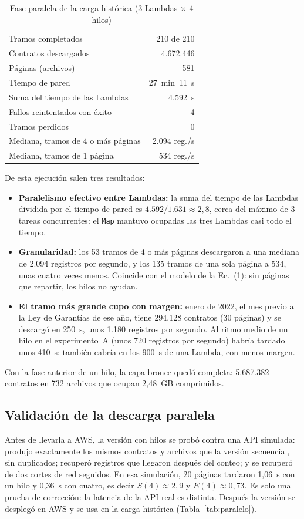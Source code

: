 \documentclass[conference]{IEEEtran}
\begin{document}
\begin{table}[htbp]
\caption{Fase paralela de la carga histórica (3 Lambdas $\times$ 4 hilos)}
\label{tab:fase}
\centering
\begin{tabular}{@{}lr@{}}
\toprule
Tramos completados & 210 de 210 \\
Contratos descargados & 4.672.446 \\
Páginas (archivos) & 581 \\
Tiempo de pared & 27~min~11~s \\
Suma del tiempo de las Lambdas & 4.592~s \\
Fallos reintentados con éxito & 4 \\
Tramos perdidos & 0 \\
\midrule
Mediana, tramos de 4 o más páginas & 2.094 reg./s \\
Mediana, tramos de 1 página & 534 reg./s \\
\bottomrule
\end{tabular}
\end{table}

De esta ejecución salen tres resultados:
\begin{itemize}
  \item \textbf{Paralelismo efectivo entre Lambdas:} la suma del tiempo de las Lambdas dividida por el tiempo de pared es $4.592 / 1.631 \approx 2{,}8$, cerca del máximo de 3 tareas concurrentes: el \texttt{Map} mantuvo ocupadas las tres Lambdas casi todo el tiempo.
  \item \textbf{Granularidad:} los 53 tramos de 4 o más páginas descargaron a una mediana de 2.094 registros por segundo, y los 135 tramos de una sola página a 534, unas cuatro veces menos. Coincide con el modelo de la Ec.~(1): sin páginas que repartir, los hilos no ayudan.
  \item \textbf{El tramo más grande cupo con margen:} enero de 2022, el mes previo a la Ley de Garantías de ese año, tiene 294.128 contratos (30 páginas) y se descargó en 250~s, unos 1.180 registros por segundo. Al ritmo medio de un hilo en el experimento~A (unos 720 registros por segundo) habría tardado unos 410~s: también cabría en los 900~s de una Lambda, con menos margen.
\end{itemize}

Con la fase anterior de un hilo, la capa bronce quedó completa: 5.687.382 contratos en 732 archivos que ocupan 2,48~GB comprimidos.

\subsection{Validación de la descarga paralela}
Antes de llevarla a AWS, la versión con hilos se probó contra una API simulada: produjo exactamente los mismos contratos y archivos que la versión secuencial, sin duplicados; recuperó registros que llegaron después del conteo; y se recuperó de dos cortes de red seguidos. En esa simulación, 20 páginas tardaron 1,06~s con un hilo y 0,36~s con cuatro, es decir $S(4) \approx 2{,}9$ y $E(4) \approx 0{,}73$. Es solo una prueba de corrección: la latencia de la API real es distinta. Después la versión se desplegó en AWS y se usa en la carga histórica (Tabla~\ref{tab:paralelo}).
\end{document}
